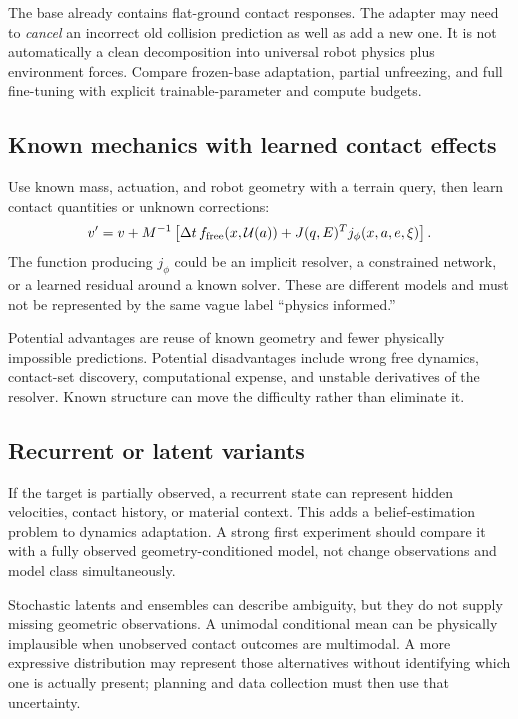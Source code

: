 The base already contains flat-ground contact responses. The adapter may need
to \emph{cancel} an incorrect old collision prediction as well as add a new one.
It is not automatically a clean decomposition into universal robot physics plus
environment forces. Compare frozen-base adaptation, partial unfreezing, and
full fine-tuning with explicit trainable-parameter and compute budgets.

\subsection{Known mechanics with learned contact effects}
Use known mass, actuation, and robot geometry with a terrain query, then learn
contact quantities or unknown corrections:
\begin{equation}
v'=v+M^{-1}\left[\Delta t\,f_{\rm free}(x,\mathcal U(a))
+J(q,E)^Tj_\phi(x,a,e,\xi)\right].
\end{equation}
The function producing $j_\phi$ could be an implicit resolver, a constrained
network, or a learned residual around a known solver. These are different
models and must not be represented by the same vague label ``physics informed.''

Potential advantages are reuse of known geometry and fewer physically impossible
predictions. Potential disadvantages include wrong free dynamics, contact-set
discovery, computational expense, and unstable derivatives of the resolver.
Known structure can move the difficulty rather than eliminate it.

\subsection{Recurrent or latent variants}
If the target is partially observed, a recurrent state can represent hidden
velocities, contact history, or material context. This adds a belief-estimation
problem to dynamics adaptation. A strong first experiment should compare it
with a fully observed geometry-conditioned model, not change observations and
model class simultaneously.

Stochastic latents and ensembles can describe ambiguity, but they do not supply
missing geometric observations. A unimodal conditional mean can be physically
implausible when unobserved contact outcomes are multimodal. A more expressive
distribution may represent those alternatives without identifying which one is
actually present; planning and data collection must then use that uncertainty.


